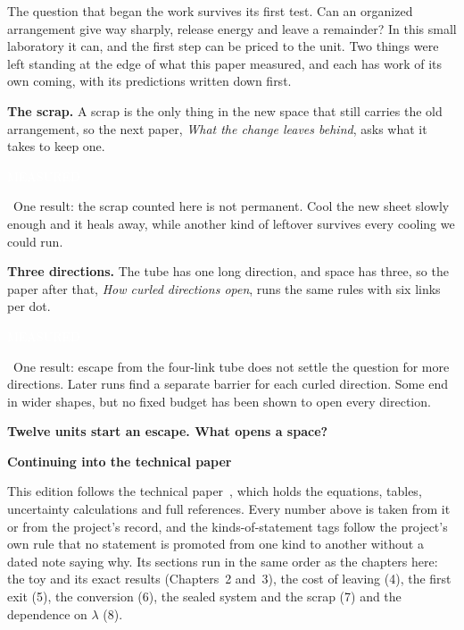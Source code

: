 \documentclass[11pt,letterpaper]{article}
\newcommand{\sub}[1]{\par\medskip{\color{ink}\large\bfseries #1}\par}
\newcommand{\tagbox}[2]{{\sffamily\scriptsize\colorbox{#1}{\textcolor{white}{\strut #2}}}}
\newcommand{\Meas}{\tagbox{kMeas}{MEASURED}}
\begin{document}
\sub{What comes next}
The question that began the work survives its first test. Can an organized arrangement give way
sharply, release energy and leave a remainder? In this small laboratory it can, and the first step
can be priced to the unit. Two things were left standing at the edge of what this paper measured,
and each has work of its own coming, with its predictions written down first.

\textbf{The scrap.} A scrap is the only thing in the new space that still carries the old
arrangement, so the next paper, \emph{What the change leaves behind}, asks what it takes to keep one.
\Meas\ One result: the scrap counted here is not permanent. Cool the new sheet slowly enough and it
heals away, while another kind of leftover survives every cooling we could run.

\textbf{Three directions.} The tube has one long direction, and space has three, so the paper after
that, \emph{How curled directions open}, runs the same rules with six links per dot. \Meas\ One
result: escape from the four-link tube does not settle the question for more directions. Later runs
find a separate barrier for each curled direction. Some end in wider shapes, but no fixed budget has
been shown to open every direction.

\begin{center}
{\color{ink}\Large\bfseries Twelve units start an escape. What opens a space?}
\end{center}

\par{}\vspace{1.4em}
{\color{ink}\LARGE\bfseries Continuing into the technical paper}\par
\vspace{0.6em}

This edition follows the technical paper~\cite{tech}, which holds the equations, tables, uncertainty
calculations and full references. Every number above is taken from it or from the project's record,
and the kinds-of-statement tags follow the project's own rule that no statement is promoted from one
kind to another without a dated note saying why. Its sections run in the same order as the chapters here:
the toy and its exact results (Chapters~2 and~3), the cost of leaving (4), the first exit (5), the
conversion (6), the sealed system and the scrap (7) and the dependence on $\lambda$ (8).
\end{document}
